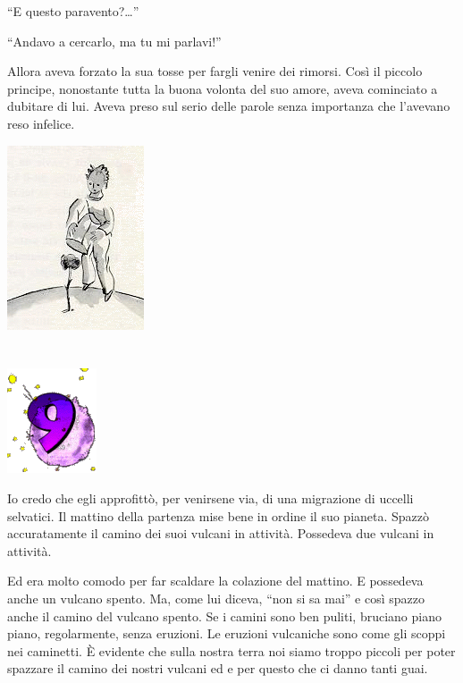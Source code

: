\documentclass[11pt]{scrbook}
\begin{document}
``E questo paravento?\ldots{}''

``Andavo a cercarlo, ma tu mi parlavi!''

Allora aveva forzato la sua tosse per fargli venire dei rimorsi. Così il piccolo principe, nonostante tutta la buona volonta del suo amore, aveva cominciato a dubitare di lui. Aveva preso sul serio delle parole senza importanza che l'avevano reso infelice.

\begin{center}
\includegraphics{img/princKvetina}
\end{center}

\chapter{}
\begin{center}
\includegraphics{img/chapter9}
\end{center}

Io credo che egli approfittò, per venirsene via, di una migrazione di uccelli selvatici. Il mattino della partenza mise bene in ordine il suo pianeta. Spazzò accuratamente il camino dei suoi vulcani in attività. Possedeva due vulcani in attività.

Ed era molto comodo per far scaldare la colazione del mattino. E possedeva anche un vulcano spento. Ma, come lui diceva, ``non si sa mai'' e così spazzo anche il camino del vulcano spento. Se i camini sono ben puliti, bruciano piano piano, regolarmente, senza eruzioni. Le eruzioni vulcaniche sono come gli scoppi nei caminetti. È evidente che sulla nostra terra noi siamo troppo piccoli per poter spazzare il camino dei nostri vulcani ed e per questo che ci danno tanti guai.
\end{document}
